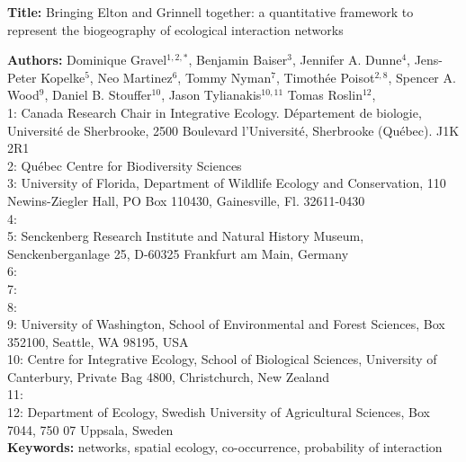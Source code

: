 \documentclass[12pt]{article}
\begin{document}
\linenumbers
\modulolinenumbers[1]

\textbf{Title:} Bringing Elton and Grinnell together: a quantitative framework to represent the biogeography of ecological interaction networks

\textbf{Authors:} Dominique Gravel$^{1,2,*}$, Benjamin Baiser$^{3}$, Jennifer A. Dunne$^{4}$, Jens-Peter Kopelke$^{5}$, Neo
Martinez$^{6}$, Tommy Nyman$^{7}$, Timoth\'ee Poisot$^{2,8}$, Spencer A. Wood$^{9}$, Daniel B. Stouffer$^{10}$, Jason Tylianakis$^{10,11}$ Tomas Roslin$^{12}$,\\

1: Canada Research Chair in Integrative Ecology. D\'epartement de
biologie, Universit\'e de Sherbrooke, 2500 Boulevard l'Universit\'e,
Sherbrooke (Québec). J1K 2R1\\

2: Qu\'ebec Centre for Biodiversity Sciences\\

3: University of Florida, Department of Wildlife Ecology and Conservation, 110 Newins-Ziegler Hall, PO Box 110430, Gainesville, Fl. 32611-0430 \\

4: \\

5: Senckenberg Research Institute and Natural History Museum, Senckenberganlage 25, D-60325 Frankfurt am Main, Germany\\

6:\\

7:\\

8:\\

9: University of Washington, School of Environmental and Forest Sciences,
Box 352100, Seattle, WA 98195, USA\\

10: Centre for Integrative Ecology, School of Biological Sciences, University of Canterbury, Private Bag 4800, Christchurch, New Zealand\\

11:\\

12: Department of Ecology, Swedish University of Agricultural Sciences, Box 7044, 750 07 Uppsala, Sweden\\

\textbf{Keywords:} networks, spatial ecology, co-occurrence, probability of interaction\\
\end{document}
